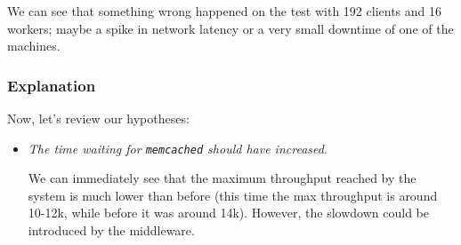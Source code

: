 \documentclass[11pt,a4paper]{article}
\renewcommand{\t}[1]{%
	{\texttt{#1}}}
\begin{document}
We can see that something wrong happened on the test with 192 clients and 
16 workers; maybe a spike in network latency or a very small downtime of one of the machines.

\subsubsection{Explanation}

Now, let's review our hypotheses: 
\begin{itemize}
	\item \emph{The time waiting for \t{memcached} should have increased}.

		We can immediately see that the maximum throughput reached by the system
		is much lower than before (this time the max throughput is around 10-12k, 
		while before it was around 14k). However, the slowdown could be introduced
		by the middleware. 


\end{itemize}
\end{document}
